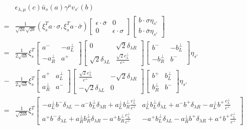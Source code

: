 \begin{eqnarray}
&&\epsilon_{\lambda, \mu}(c) \bar{u}_s(a)\gamma^\mu v_{s'}(b)\\
&=&\frac{1}{\sqrt{2a}\sqrt{2b}}(\xi^T_s a\cdot\sigma, \xi^T_{s} a\cdot \bar{\sigma})
\begin{bmatrix}
\epsilon\cdot\bar{\sigma} & 0 \\
0 & \epsilon\cdot\sigma
\end{bmatrix}
\begin{bmatrix}
b\cdot\sigma \eta_{s'}\\
b\cdot\bar{\sigma} \eta_{s'}
\end{bmatrix}
\\
&=&\frac{1}{2\sqrt{ab}}
\xi_s^T
\begin{bmatrix}
a^- & -a^\perp_L \\
-a^\perp_R & a^+
\end{bmatrix}
\begin{bmatrix}
0 & \sqrt{2}\delta_{\lambda R}\\
\sqrt{2}\delta_{\lambda L} & \frac{\sqrt{2}c^\perp_\lambda}{c^+}
\end{bmatrix}
\begin{bmatrix}
b^- & -b^\perp_L \\
-b^\perp_R & b^-
\end{bmatrix}
\eta_{s'}\\\nonumber
&-&
\frac{1}{2\sqrt{ab}}
\xi_s^T
\begin{bmatrix}
a^+ & a^\perp_L \\
a^\perp_R & a^-
\end{bmatrix}
\begin{bmatrix}
\frac{\sqrt{2}c^\perp_\lambda}{c^+} & -\sqrt{2}\delta_{\lambda R}\\
-\sqrt{2}\delta_{\lambda L} & 0
\end{bmatrix}
\begin{bmatrix}
b^+ & b^\perp_L \\
b^\perp_R & b^-
\end{bmatrix}
\eta_{s'}
\\
&=&\frac{1}{\sqrt{2ab}}
\xi_s^T
\begin{bmatrix}
-a^\perp_L b^- \delta_{\lambda L} - a^- b^\perp_L \delta_{\lambda R} + a^\perp_L b^\perp_R\frac{c^\perp_\lambda}{c^+} &
a^\perp_L b^\perp_L \delta_{\lambda L} + a^- b^+ \delta_{\lambda R} - a^\perp_L b^+\frac{c^\perp_\lambda}{c^+}
\\
a^+ b^- \delta_{\lambda L} + a^\perp_R b^\perp_R \delta_{\lambda R} - a^+ b^\perp_R\frac{c^\perp_\lambda}{c^+} &
-a^+ b^\perp_L \delta_{\lambda L} - a^\perp_R b^+ \delta_{\lambda R} + a^+ b^+\frac{c^\perp_\lambda}{c^+}

\end{bmatrix}
\end{eqnarray}
